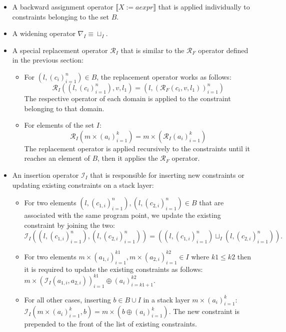 \documentclass[10pt]{report}
\begin{document}
\begin{itemize}
	\item A backward assignment operator $ \llbracket X := aexpr \rrbracket $ that is applied individually to constraints belonging to the set $ B $. 
	
	\item A widening operator $ \nabla_{I} \equiv \sqcup_{I} .$
	\item A special replacement operator $ \mathcal{R}_{I} $ that is similar to the $ \mathcal{R}_{F} $ operator defined in the previous section:
	\begin{itemize}
		\item For $ (l, (c_{i})_{i=1}^{n}) \in B$, the replacement operator works as follows: $$ \mathcal{R}_{I}((l, (c_{i})_{i=1}^{n}), v, l_{1}) = (l, (\mathcal{R}_{F}(c_{i}, v, l_{1}))_{i=1}^{n}) $$ The respective operator of each domain is applied to the constraint belonging to that domain. 
		\item For elements of the set $ I $: $$ \mathcal{R}_{I}(m \times (a_{i})_{i=1}^{k}) = m \times (\mathcal{R}_{I}(a_{i})_{i=1}^{k}) $$ The replacement operator is applied recursively to the constraints until it reaches an element of $ B $, then it applies the $ \mathcal{R}_{F} $ operator. 
	\end{itemize}
	\item An insertion operator $ \mathcal{I}_{I} $ that is responsible for inserting new constraints or updating existing constraints on a stack layer:
	\begin{itemize}
		\item For two elements $ (l, (c_{1,i})_{i=1}^{n}), (l, (c_{2,i})_{i=1}^{n} ) \in B $ that are associated with the same program point, we update the existing constraint by joining the two: $ \mathcal{I}_{I}((l, (c_{1,i})_{i=1}^{n}), (l, (c_{2,i})_{i=1}^{n})) = ((l, (c_{1,i})_{i=1}^{n}) \sqcup_{I} (l, (c_{2,i})_{i=1}^{n})).$
		\item For two elements $ m \times (a_{1,i})_{i=1}^{k1}, m \times (a_{2,i})_{i=1}^{k2} \in I $ where $ k1 \leq k2 $ then it is required to update the existing constraints as follows: $ m \times (\mathcal{I}_{I}(a_{1,i}, a_{2,i}))_{i=1}^{k1} \oplus (a_{i})_{i=k1+1}^{k2}.$ 
		
		\item For all other cases, inserting $ b \in B \cup I$ in a stack layer $ m \times (a_{i})_{i=1}^{k} $: $ \mathcal{I}_{I}(m \times (a_{i})_{i=1}^{k}, b) = m \times (b \oplus (a_{i})_{i=1}^{k})$. The new constraint is prepended to the front of the list of existing constraints. 
	\end{itemize}
\end{itemize}
\end{document}
